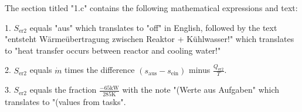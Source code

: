 The section titled "1.c" contains the following mathematical expressions and text:

1. \( S_{\text{er2}} \) equals "aus" which translates to "off" in English, followed by the text "entsteht Wärmeübertragung zwischen Reaktor + Kühlwasser!" which translates to "heat transfer occurs between reactor and cooling water!"

2. \( S_{\text{er2}} \) equals \( \dot{m} \) times the difference \( (s_{\text{aus}} - s_{\text{ein}}) \) minus \( \frac{Q_{\text{er2}}}{T} \).

3. \( S_{\text{er2}} \) equals the fraction \( \frac{-65 \text{kW}}{285 \text{K}} \) with the note "(Werte aus Aufgaben" which translates to "(values from tasks".